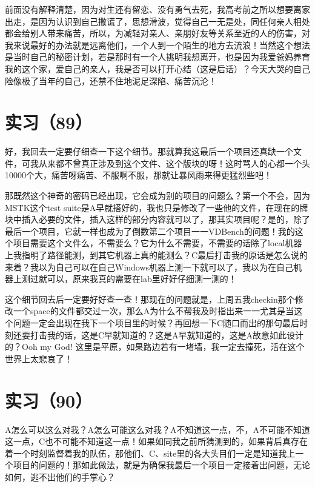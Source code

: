 \documentclass[12pt]{book}
\begin{document}
前面没有解释清楚，因为对生还有留恋、没有勇气去死，我高考前之所以想要离家出走，是因为认识到自己撒谎了，思想滑波，觉得自己一无是处，同任何亲人相处都会给别人带来痛苦，所以，为减轻对亲人、亲朋好友等关系至近的人的伤害，对我来说最好的办法就是远离他们，一个人到一个陌生的地方去流浪！当然这个想法是当时自己的秘密计划，若是那时有一个人挑明我想离开，也是因为我爱爸妈养育我的这个家，爱自己的亲人，我是否可以打开心结（这是后话）？今天大哭的自己险像极了当年的自己，还禁不住地泥足深陷、痛苦沉沦！


\section{实习（89）　}
\label{sec-5-92}

好，我回去一定要仔细查一下这个细节。那就算我这最后一个项目还真缺一个文件，可我从来都不曾真正涉及到这个文件、这个版块的呀！这时骂人的心都一个头10000个大，痛苦呀痛苦、不服啊不服，那就让暴风雨来得更猛烈些吧！

那既然这个神奇的密码已经出现，它会成为别的项目的问题么？第一个不会，因为MSTK这个test suite是A早就搭好的，我也只是修改了一些他的文件，在现在的牌块中插入必要的文件，插入这样的部分内容就可以了，那其实项目呢？是的，除了最后一个项目，它就一样也成为了倒数第二个项目一一VDBench的问题！我的这个项目需要这个文件么，不需要么？它为什么不需要，不需要的话除了local机器上我指明了路径能测，到其它机器上真的能测么？C最后打击我的原话是怎么说的来着？我以为自己可以在自己Windows机器上测一下就可以了，我以为在自己机器上测过就可以，原来我真的需要在lab里好好仔细测一测的！

这个细节回去后一定要好好查一查！那现在的问题就是，上周五我checkin那个修改一个space的文件都交过一次，那么A为什么不帮我及时指出来一一尤其是当这个问题一定会出现在我下一个项目里的时候？再回想一下C随口而出的那句最后时刻还要打击我的话，这是C早就知道的？这是A早就知道的，这是A故意如此设计的？Ooh my God!  这里是平原，如果路边若有一堵墙，我一定去撞死，活在这个世界上太悲哀了！


\section{实习（90）　}
\label{sec-5-93}

A怎么可以这么对我？A怎么可能这么对我？A不知道这一点，不，A不可能不知道这一点，C也不可能不知道这一点！如果如同我之前所猜测到的，如果背后真存在着一个时刻监督着我的队伍，那他们、C、site里的各大头目们一定是知道我上一个项目的问题的！那如此做法，就是为确保我最后一个项目一定接着出问题，无论如何，逃不出他们的手掌心？
\end{document}
